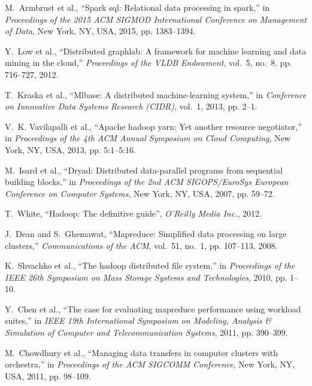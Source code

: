 \documentclass[10pt,journal,compsoc]{IEEEtran}
\begin{document}
\begin{thebibliography}{43}
M.~Armbrust et al., ``Spark sql: Relational
  data processing in spark,'' in \emph{Proceedings of the 2015 ACM SIGMOD
  International Conference on Management of Data}, New York, NY, USA, 2015, pp. 1383--1394.

Y.~Low et al.,
  ``Distributed graphlab: A framework for machine learning and data mining in
  the cloud,'' \emph{Proceedings of the VLDB Endowment}, vol.~5, no.~8, pp.
  716--727, 2012.

T.~Kraska et al., ``Mlbase: A distributed machine-learning system,'' in
  \emph{Conference on Innovative Data Systems Research (CIDR)}, vol.~1, 2013,
  pp. 2--1.

V.~K. Vavilapalli et al., ``Apache hadoop yarn: Yet another
  resource negotiator,'' in \emph{Proceedings of the 4th ACM Annual Symposium
  on Cloud Computing}, New York, NY, USA, 2013, pp. 5:1--5:16.


M.~Isard et al., ``Dryad: Distributed
  data-parallel programs from sequential building blocks,'' in
  \emph{Proceedings of the 2nd ACM SIGOPS/EuroSys European Conference on
  Computer Systems}, New York, NY, USA, 2007, pp. 59--72.

T.~White, ``Hadoop: The definitive guide'', \emph{O'Reilly Media Inc.}, 2012.

J.~Dean and S.~Ghemawat, ``Mapreduce: Simplified data processing on large
  clusters,'' \emph{Communications of the ACM}, vol.~51, no.~1, pp. 107--113,
  2008.

K.~Shvachko et al., ``The hadoop distributed file
  system,'' in \emph{Proceedings of the IEEE 26th Symposium on Mass Storage
  Systems and Technologies}, 2010,
  pp. 1--10.

Y.~Chen et al., ``The case for evaluating
  mapreduce performance using workload suites,'' in \emph{IEEE 19th
  International Symposium on Modeling, Analysis \& Simulation of Computer and
  Telecommunication Systems}, 2011, pp. 390--399.

M.~Chowdhury et al., ``Managing data
  transfers in computer clusters with orchestra,'' in \emph{Proceedings of the
  ACM SIGCOMM Conference}, New York, NY,
  USA, 2011, pp. 98--109.


\end{thebibliography}
\end{document}
